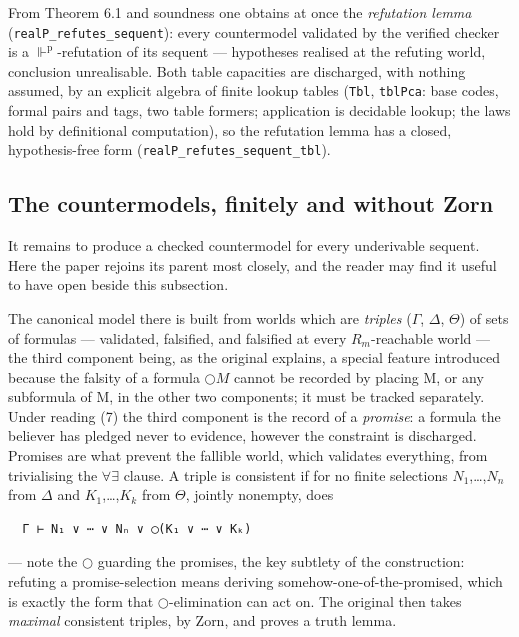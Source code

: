 From Theorem 6.1 and soundness one obtains at once the \emph{refutation
lemma} (\texttt{realP\_refutes\_sequent}): every countermodel validated by the verified
checker is a \ensuremath{\Vdash^{\mathrm{p}}}-refutation of its sequent --- hypotheses realised at the
refuting world, conclusion unrealisable. Both table capacities are
discharged, with nothing assumed, by an explicit algebra of finite
lookup tables (\texttt{Tbl}, \texttt{tblPca}: base codes, formal pairs and tags, two
table formers; application is decidable lookup; the laws hold by
definitional computation), so the refutation lemma has a closed, hypothesis-free
form (\texttt{realP\_refutes\_sequent\_tbl}).

\subsection{The countermodels, finitely and without Zorn}\label{62-the-countermodels-finitely-and-without-zorn}

It remains to produce a checked countermodel for every underivable
sequent. Here the paper rejoins its parent most closely, and the reader
may find it useful to have \cite[\S4]{FairtloughMendler1997} open beside this subsection.

The canonical model there is built from worlds which are \emph{triples}
(\ensuremath{\Gamma}, \ensuremath{\Delta}, \ensuremath{\Theta}) of sets of formulas --- validated, falsified, and falsified at
every \ensuremath{R_{m}}-reachable world --- the third component being, as the original
explains, a special feature introduced because the falsity of a formula
\ensuremath{\bigcirc M} cannot be recorded by placing M, or any subformula of M, in the
other two components; it must be tracked separately. Under reading (7)
the third component is the record of a \emph{promise}: a formula the
believer has pledged never to evidence, however the constraint is
discharged. Promises are what prevent the fallible world, which
validates everything, from trivialising the \ensuremath{\forall\exists} clause. A triple is
consistent if for no finite selections \ensuremath{N_{1}},\ldots,\ensuremath{N_{n}} from \ensuremath{\Delta} and \ensuremath{K_{1}},\ldots,\ensuremath{K_{k}} from
\ensuremath{\Theta}, jointly nonempty, does

\begin{lstlisting}
  Γ ⊢ N₁ ∨ ⋯ ∨ Nₙ ∨ ◯(K₁ ∨ ⋯ ∨ Kₖ)
\end{lstlisting}

--- note the \ensuremath{\bigcirc} guarding the promises, the key subtlety of the
construction: refuting a promise-selection means deriving
somehow-one-of-the-promised, which is exactly the form that \ensuremath{\bigcirc}-elimination
can act on. The original then takes \emph{maximal}
consistent triples, by Zorn, and proves a truth lemma.

